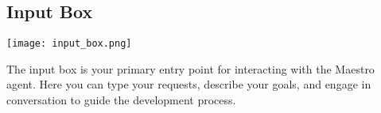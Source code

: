 \subsection*{Input Box}

\begin{center}
\texttt{[image: input\_box.png]}
\end{center}

The input box is your primary entry point for interacting with the Maestro agent. Here you can type your requests, describe your goals, and engage in conversation to guide the development process.